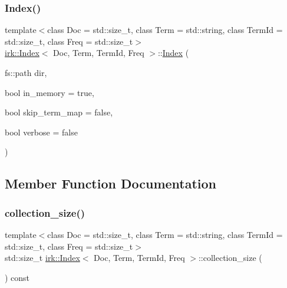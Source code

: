 \mbox{\label{classirk_1_1Index_a389b4576226ef4168d659de27ce220cb}} 
\subsubsection{\texorpdfstring{Index()}{Index()}\hspace{0.1cm}{\footnotesize\ttfamily [2/2]}}
{\footnotesize\ttfamily template$<$class Doc  = std\+::size\+\_\+t, class Term  = std\+::string, class Term\+Id  = std\+::size\+\_\+t, class Freq  = std\+::size\+\_\+t$>$ \\
\mbox{\hyperlink{classirk_1_1Index}{irk\+::\+Index}}$<$ Doc, Term, Term\+Id, Freq $>$\+::\mbox{\hyperlink{classirk_1_1Index}{Index}} (\begin{DoxyParamCaption}\item[{fs\+::path}]{dir,  }\item[{bool}]{in\+\_\+memory = {\ttfamily true},  }\item[{bool}]{skip\+\_\+term\+\_\+map = {\ttfamily false},  }\item[{bool}]{verbose = {\ttfamily false} }\end{DoxyParamCaption})\hspace{0.3cm}{\ttfamily [inline]}}



\subsection{Member Function Documentation}
\mbox{\label{classirk_1_1Index_ace64d8d68e3c97a790747bd65a17a6b4}} 
\subsubsection{\texorpdfstring{collection\+\_\+size()}{collection\_size()}}
{\footnotesize\ttfamily template$<$class Doc  = std\+::size\+\_\+t, class Term  = std\+::string, class Term\+Id  = std\+::size\+\_\+t, class Freq  = std\+::size\+\_\+t$>$ \\
std\+::size\+\_\+t \mbox{\hyperlink{classirk_1_1Index}{irk\+::\+Index}}$<$ Doc, Term, Term\+Id, Freq $>$\+::collection\+\_\+size (\begin{DoxyParamCaption}{ }\end{DoxyParamCaption}) const\hspace{0.3cm}{\ttfamily [inline]}}

